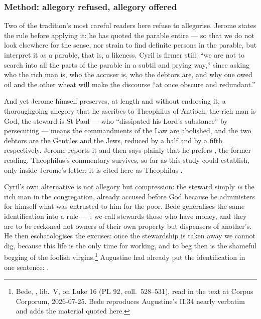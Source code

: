 \subsubsection*{Method: allegory refused, allegory offered}

Two of the tradition's most careful readers here refuse to allegorise. Jerome
states the rule before applying it: he has quoted the parable entire 
--- so that we do not look elsewhere for the sense, nor strain to find definite
persons in the parable, but interpret it as a parable, that is, a likeness.
Cyril is firmer still: ``we are not to search into all the parts of the parable
in a subtil and prying way,'' since asking who the rich man is, who the accuser
is, who the debtors are, and why one owed oil and the other wheat will make the
discourse ``at once obscure and redundant.''

And yet Jerome himself preserves, at length and without endorsing it, a
thoroughgoing allegory that he ascribes to Theophilus of Antioch: the rich man
is God, the steward is St Paul --- who ``dissipated his Lord's substance'' by
persecuting ---  means the commandments of the Law are
abolished, and the two debtors are the Gentiles and the Jews, reduced by a half
and by a fifth respectively. Jerome reports it and then says plainly that he
prefers , the former reading. Theophilus's
commentary survives, so far as this study could establish, only inside Jerome's
letter; it is cited here as Theophilus .

Cyril's own alternative is not allegory but compression: the steward simply
\emph{is} the rich man in the congregation, already accused before God because
he administers for himself what was entrusted to him for the poor. Bede
generalises the same identification into a rule --- : we call stewards those who have money, and they
are to be reckoned not owners of their own property but dispensers of another's.
He then eschatologises the excuses: once the stewardship is taken away we cannot
dig, because this life is the only time for working, and to beg then is the
shameful begging of the foolish virgins.\footnote{Bede, , lib.\ V, on Luke 16 (PL 92, coll.\ 528--531), read in the
 text at Corpus Corporum, 2026-07-25. Bede reproduces
Augustine's  II.34 nearly verbatim and adds the material
quoted here.} Augustine had already put the identification in one sentence:
.


